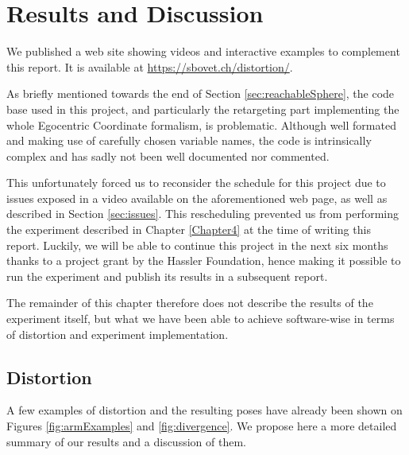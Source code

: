 
\chapter{Results and Discussion}
\label{Chapter5}

We published a web site showing videos and interactive examples to complement this report. It is available at \url{https://sbovet.ch/distortion/}.

As briefly mentioned towards the end of Section \ref{sec:reachableSphere}, the code base used in this project, and particularly the retargeting part implementing the whole Egocentric Coordinate formalism, is problematic. Although well formated and making use of carefully chosen variable names, the code is intrinsically complex and has sadly not been well documented nor commented.

This unfortunately forced us to reconsider the schedule for this project due to issues exposed in a video available on the aforementioned web page, as well as described in Section \ref{sec:issues}. This rescheduling prevented us from performing the experiment described in Chapter \ref{Chapter4} at the time of writing this report. Luckily, we will be able to continue this project in the next six months thanks to a project grant by the Hassler Foundation, hence making it possible to run the experiment and publish its results in a subsequent report.

The remainder of this chapter therefore does not describe the results of the experiment itself, but what we have been able to achieve software-wise in terms of distortion and experiment implementation.

\section{Distortion}

A few examples of distortion and the resulting poses have already been shown on Figures \ref{fig:armExamples} and \ref{fig:divergence}. We propose here a more detailed summary of our results and a discussion of them.


